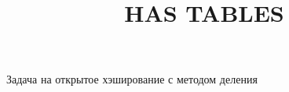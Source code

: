 \documentclass[a4paper, 14pt]{extarticle}
\author{}
\title{\MakeUppercase{Has tables}}
\date{}
\begin{document}
\maketitle
\thispagestyle{empty}
\pagestyle{empty}
Задача на открытое хэширование с методом деления
\inputminted{cpp}{task1.cpp}
\end{document}
